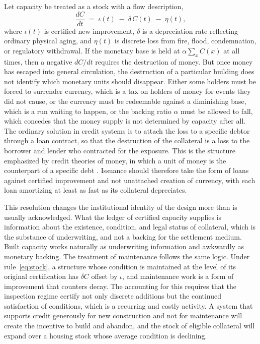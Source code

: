 \documentclass[11pt]{article}
\theoremstyle{definition}
\begin{document}
Let capacity be treated as a stock with a flow description,
\begin{equation}
\frac{dC}{dt} \;=\; \iota(t) \;-\; \delta\,C(t) \;-\; \eta(t),
\label{eq:stock}
\end{equation}
where $\iota(t)$ is certified new improvement, $\delta$ is a depreciation rate reflecting ordinary physical aging, and $\eta(t)$ is discrete loss from fire, flood, condemnation, or regulatory withdrawal. If the monetary base is held at $\alpha\sum_x C(x)$ at all times, then a negative $dC/dt$ requires the destruction of money. But once money has escaped into general circulation, the destruction of a particular building does not identify which monetary units should disappear. Either some holders must be forced to surrender currency, which is a tax on holders of money for events they did not cause, or the currency must be redeemable against a diminishing base, which is a run waiting to happen, or the backing ratio $\alpha$ must be allowed to fall, which concedes that the money supply is not determined by capacity after all. The ordinary solution in credit systems is to attach the loss to a specific debtor through a loan contract, so that the destruction of the collateral is a loss to the borrower and lender who contracted for the exposure. This is the structure emphasized by credit theories of money, in which a unit of money is the counterpart of a specific debt \cite{mitchellinnes1913}. Issuance should therefore take the form of loans against certified improvement and not unattached creation of currency, with each loan amortizing at least as fast as its collateral depreciates.

This resolution changes the institutional identity of the design more than is usually acknowledged. What the ledger of certified capacity supplies is information about the existence, condition, and legal status of collateral, which is the substance of underwriting, and not a backing for the settlement medium. Built capacity works naturally as underwriting information and awkwardly as monetary backing. The treatment of maintenance follows the same logic. Under rule~\eqref{eq:stock}, a structure whose condition is maintained at the level of its original certification has $\delta C$ offset by $\iota$, and maintenance work is a form of improvement that counters decay. The accounting for this requires that the inspection regime certify not only discrete additions but the continued satisfaction of conditions, which is a recurring and costly activity. A system that supports credit generously for new construction and not for maintenance will create the incentive to build and abandon, and the stock of eligible collateral will expand over a housing stock whose average condition is declining.
\end{document}

